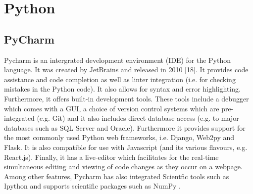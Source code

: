 \section{Python}
\subsection{PyCharm}
Pycharm is an intergrated development environment (IDE) for the Python language. It was created by JetBrains and released in 2010 [18]. It provides code assistance and code completion as well as linter integration (i.e. for checking mistakes in the Python code). It also allows for syntax and error highlighting. Furthermore, it offers built-in development tools. These tools include a debugger which comes with a GUI, a choice of version control systems which are pre-integrated (e.g. Git) and it also includes direct database access (e.g. to major databases such as SQL Server and Oracle). Furthermore it provides support for the most commonly used Python web frameworks, i.e.  Django, Web2py and Flask. It is also compatible for use with Javascript (and its various flavours, e.g. React.js). Finally, it has a live-editor which facilitates for the real-time simultaneous editing and viewing of code changes as they occur on a webpage. Among other features, Pycharm has also integrated Scientfic tools such as Ipython and supports scientific packages such as NumPy \cite{pycharm}.
